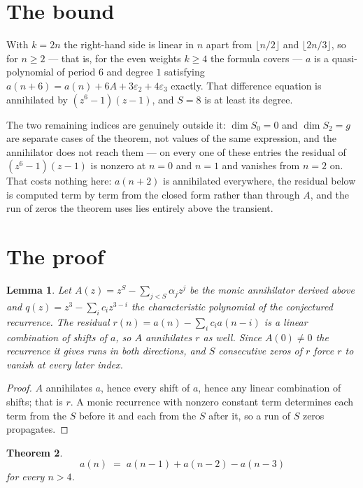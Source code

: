 \documentclass[11pt,a4paper]{article}
\theoremstyle{plain}
\newtheorem{theorem}{Theorem}
\newtheorem{lemma}[theorem]{Lemma}
\theoremstyle{definition}
\begin{document}
\section{The bound}

With $k=2n$ the right-hand side is linear in $n$ apart from $\lfloor n/2\rfloor$ and
$\lfloor 2n/3\rfloor$, so for $n\ge2$ --- that is, for the even weights $k\ge4$ the formula
covers --- $a$ is a quasi-polynomial of period $6$ and degree $1$ satisfying
$a(n+6)=a(n)+6A+3\varepsilon_2+4\varepsilon_3$ exactly. That difference equation is annihilated
by $(z^6-1)(z-1)$, and $S=8$ is at least its degree.

The two remaining indices are genuinely outside it: $\dim S_0=0$ and $\dim S_2=g$ are separate
cases of the theorem, not values of the same expression, and the annihilator does not reach
them --- on every one of these entries the residual of $(z^6-1)(z-1)$ is nonzero at $n=0$ and
$n=1$ and vanishes from $n=2$ on. That costs nothing here: $a(n+2)$ is annihilated everywhere,
the residual below is computed term by term from the closed form rather than through $A$, and
the run of zeros the theorem uses lies entirely above the transient.

\section{The proof}

\begin{lemma}\label{lem:crit}
Let $A(z)=z^S-\sum_{j<S}\alpha_jz^{j}$ be the monic annihilator derived above and
$q(z)=z^{3}-\sum_ic_iz^{3-i}$ the characteristic polynomial of the conjectured
recurrence. The residual $r(n)=a(n)-\sum_ic_ia(n-i)$ is a linear combination of shifts of $a$,
so $A$ annihilates $r$ as well. Since $A(0)\ne0$ the recurrence it gives runs in both
directions, and $S$ consecutive zeros of $r$ force $r$ to vanish at every later index.
\end{lemma}

\begin{proof}
$A$ annihilates $a$, hence every shift of $a$, hence any linear combination of shifts; that is
$r$. A monic recurrence with nonzero constant term determines each term from the $S$ before it
and each from the $S$ after it, so a run of $S$ zeros propagates.
\end{proof}

\begin{theorem}
\[
a(n)\;=\;a(n-1) + a(n-2) - a(n-3)
\]
for every $n>4$.
\end{theorem}
\end{document}
